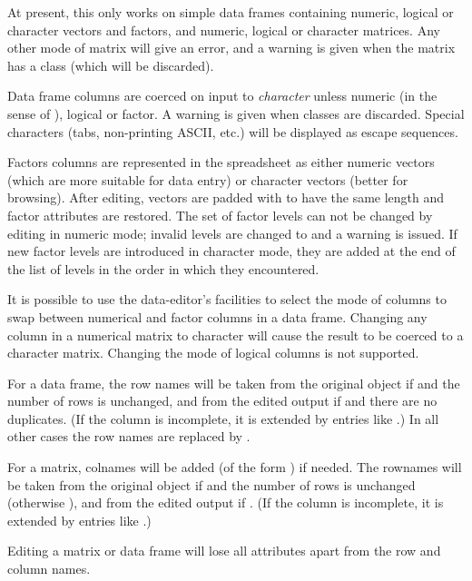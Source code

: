 %
\begin{Details}\relax
At present, this only works on simple data frames containing numeric,
logical or character vectors and factors, and numeric, logical or
character matrices.  Any other mode of matrix will give an error, and
a warning is given when the matrix has a class (which will be discarded).

Data frame columns are coerced on input to \emph{character} unless
numeric (in the sense of ), logical or factor.  A
warning is given when classes are discarded.  Special characters
(tabs, non-printing ASCII, etc.) will be displayed as escape sequences.

Factors columns are represented in the spreadsheet as either numeric
vectors (which are more suitable for data entry) or character vectors
(better for browsing). After editing, vectors are padded with
 to have the same length and factor attributes are restored.
The set of factor levels can not be changed by editing in numeric
mode; invalid levels are changed to  and a warning is issued.
If new factor levels are introduced in character mode, they are added
at the end of the list of levels in the order in which they
encountered.

It is possible to use the data-editor's facilities to select the mode
of columns to swap between numerical and factor columns in a data
frame.  Changing any column in a numerical matrix to character will
cause the result to be coerced to a character matrix.  Changing 
the mode of logical columns is not supported.

For a data frame, the row names will be taken from the original object
if  and the number of rows is unchanged,
and from the edited output if  and there
are no duplicates.  (If the  column is incomplete, it
is extended by entries like .)  In all other cases the
row names are replaced by .

For a matrix, colnames will be added (of the form ) if
needed.  The rownames will be taken from the original object if
 and the number of rows is unchanged
(otherwise ), and from the edited output if
.  (If the  column is
incomplete, it is extended by entries like .)

Editing a matrix or data frame will lose all attributes apart from the
row and column names.
\end{Details}

